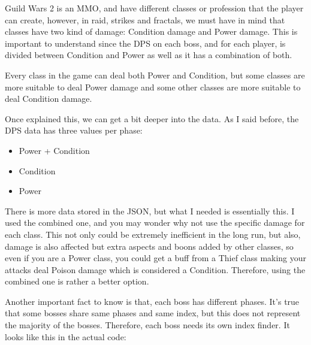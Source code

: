 \documentclass[12pt,a4paper]{article}
\begin{document}
    Guild Wars 2 is an MMO, and have different classes or profession that the player can create, however, in
    raid, strikes and fractals, we must have in mind that classes have two kind of damage: Condition damage
    and Power damage. This is important to understand since the DPS on each boss, and for each player, is divided
    between Condition and Power as well as it has a combination of both.

    Every class in the game can deal both Power and Condition, but some classes are more suitable to deal Power
    damage and some other classes are more suitable to deal Condition damage.

    Once explained this, we can get a bit deeper into the data. As I said before, the DPS data has three values
    per phase:
    \begin{itemize}
        \item Power + Condition
        \item Condition
        \item Power
    \end{itemize} 

    There is more data stored in the JSON, but what I needed is essentially this. I used the combined one, and
    you may wonder why not use the specific damage for each class. This not only could be extremely inefficient in
    the long run, but also, damage is also affected but extra aspects and boons added by other classes, so even if
    you are a Power class, you could get a buff from a Thief class making your attacks deal Poison damage which is 
    considered a Condition. Therefore, using the combined one is rather a better option.

    \newpage

    Another important fact to know is that, each boss has different phases. It's true that some bosses share same phases
    and same index, but this does not represent the majority of the bosses. Therefore, each boss needs its own index
    finder. It looks like this in the actual code:
\end{document}
